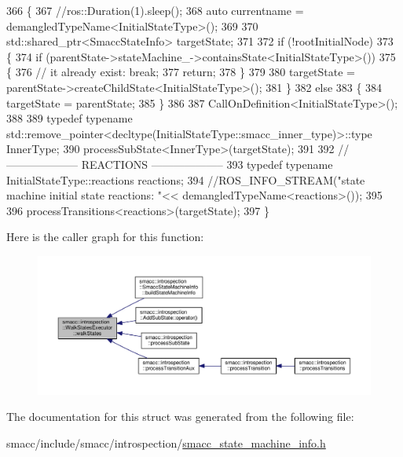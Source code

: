 \begin{DoxyCode}
366 \{
367     \textcolor{comment}{//ros::Duration(1).sleep();}
368     \textcolor{keyword}{auto} currentname = demangledTypeName<InitialStateType>();
369 
370     std::shared\_ptr<SmaccStateInfo> targetState;
371 
372     \textcolor{keywordflow}{if} (!rootInitialNode)
373     \{
374         \textcolor{keywordflow}{if} (parentState->stateMachine\_->containsState<InitialStateType>())
375         \{
376             \textcolor{comment}{// it already exist: break;}
377             \textcolor{keywordflow}{return};
378         \}
379 
380         targetState = parentState->createChildState<InitialStateType>();
381     \}
382     \textcolor{keywordflow}{else}
383     \{
384         targetState = parentState;
385     \}
386 
387     CallOnDefinition<InitialStateType>();
388 
389     \textcolor{keyword}{typedef} \textcolor{keyword}{typename} std::remove\_pointer<decltype(InitialStateType::smacc\_inner\_type)>::type InnerType;
390     processSubState<InnerType>(targetState);
391 
392     \textcolor{comment}{// -------------------- REACTIONS --------------------}
393     \textcolor{keyword}{typedef} \textcolor{keyword}{typename} InitialStateType::reactions reactions;
394     \textcolor{comment}{//ROS\_INFO\_STREAM("state machine initial state reactions: "<< demangledTypeName<reactions>());}
395 
396     processTransitions<reactions>(targetState);
397 \}
\end{DoxyCode}


Here is the caller graph for this function\+:\nopagebreak
\begin{figure}[H]
\begin{center}
\leavevmode
\includegraphics[width=350pt]{structsmacc_1_1introspection_1_1WalkStatesExecutor_a21848ccc6e7a7ddee0ccfff97e550ec6_icgraph}
\end{center}
\end{figure}




The documentation for this struct was generated from the following file\+:\begin{DoxyCompactItemize}
\item 
smacc/include/smacc/introspection/\hyperlink{smacc__state__machine__info_8h}{smacc\+\_\+state\+\_\+machine\+\_\+info.\+h}\end{DoxyCompactItemize}
